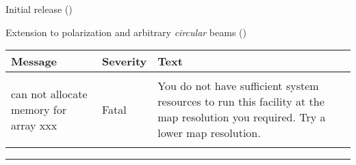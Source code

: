 \begin{release}
  \begin{relist}
    \item Initial release ()
    \item Extension to polarization and arbitrary {\em circular} beams ()
  \end{relist}
\end{release}

\newpage
\begin{messages}
{
\begin{tabular}{p{0.25\hsize} p{0.1\hsize} p{0.35\hsize}} \hline  
  \textbf{Message} & \textbf{Severity} & \textbf{Text} \\ \hline
                   &                   &   \\ %
can not allocate memory for array xxx &  Fatal & You do not have
                   sufficient system resources to run this
                   facility at the map resolution you required. 
  Try a lower map resolution.  \\ 
                   &                   &   \\ \hline %
\end{tabular}
} 
\end{messages}

\rule{\hsize}{2mm}

\newpage

